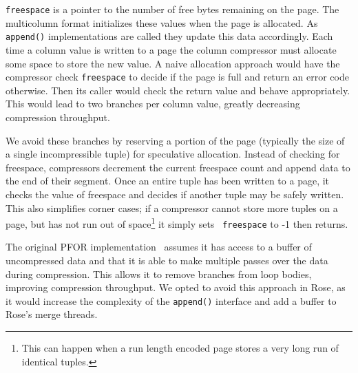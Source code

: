\documentclass{vldb}
\newcommand{\rows}{Rose\xspace}
\newcommand{\rowss}{Rose's\xspace}
\begin{document}
{\tt freespace} is a pointer to the number of free bytes
remaining on the page.  The multicolumn format initializes these
values when the page is allocated.  As {\tt append()} implementations
are called they update this data accordingly.  Each time a column
value is written to a page the column compressor must allocate some
space to store the new value.  A naive allocation approach would have
the compressor check {\tt freespace} to decide if the page is full
and return an error code otherwise.  Then its caller would check the
return value and behave appropriately.  This would lead to two branches
per column value, greatly decreasing compression throughput.

We avoid these branches by reserving a portion of the page (typically the
size of a single incompressible tuple) for speculative allocation.
Instead of checking for freespace, compressors decrement the current
freespace count and append data to the end of their segment.
Once an entire tuple has been written to a page,
it checks the value of freespace and decides if another tuple may be
safely written.  This also simplifies corner cases; if a
compressor cannot store more tuples on a page, but has not run out of
space\footnote{This can happen when a run length encoded page stores a
  very long run of identical tuples.} it simply sets {\tt
  freespace} to -1 then returns.



The original PFOR implementation~\cite{pfor} assumes it has access to
a buffer of uncompressed data and that it is able to make multiple
passes over the data during compression.  This allows it to remove
branches from loop bodies, improving compression throughput.  We opted
to avoid this approach in \rows, as it would increase the complexity
of the {\tt append()} interface and add a buffer to \rowss merge threads.

\end{document}
